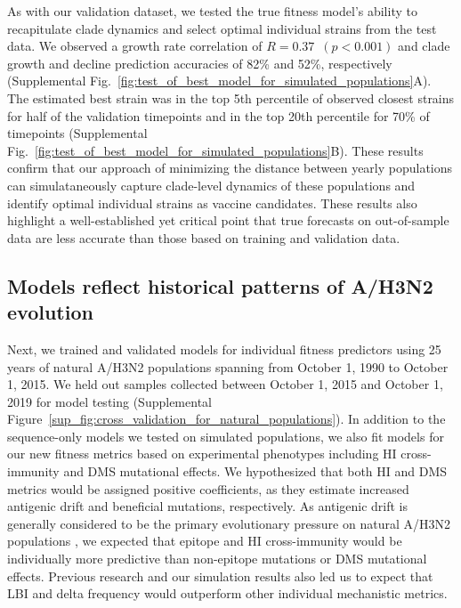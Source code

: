 As with our validation dataset, we tested the true fitness model's ability to recapitulate clade dynamics and select optimal individual strains from the test data.
We observed a growth rate correlation of $R = 0.37$~$(p < 0.001)$ and clade growth and decline prediction accuracies of 82\% and 52\%, respectively (Supplemental Fig.~\ref{fig:test_of_best_model_for_simulated_populations}A).
The estimated best strain was in the top 5th percentile of observed closest strains for half of the validation timepoints and in the top 20th percentile for 70\% of timepoints (Supplemental Fig.~\ref{fig:test_of_best_model_for_simulated_populations}B).
These results confirm that our approach of minimizing the distance between yearly populations can simulataneously capture clade-level dynamics of these populations and identify optimal individual strains as vaccine candidates.
These results also highlight a well-established yet critical point that true forecasts on out-of-sample data are less accurate than those based on training and validation data.

\subsection*{Models reflect historical patterns of A/H3N2 evolution}

Next, we trained and validated models for individual fitness predictors using 25 years of natural A/H3N2 populations spanning from October 1, 1990 to October 1, 2015.
We held out samples collected between October 1, 2015 and October 1, 2019 for model testing (Supplemental Figure~\ref{sup_fig:cross_validation_for_natural_populations}).
In addition to the sequence-only models we tested on simulated populations, we also fit models for our new fitness metrics based on experimental phenotypes including HI cross-immunity and DMS mutational effects.
We hypothesized that both HI and DMS metrics would be assigned positive coefficients, as they estimate increased antigenic drift and beneficial mutations, respectively.
As antigenic drift is generally considered to be the primary evolutionary pressure on natural A/H3N2 populations \cite{Smith:2004jc,Bedford:2014bf,Luksza:2014hj}, we expected that epitope and HI cross-immunity would be individually more predictive than non-epitope mutations or DMS mutational effects.
Previous research \cite{Neher:2016hy} and our simulation results also led us to expect that LBI and delta frequency would outperform other individual mechanistic metrics.

